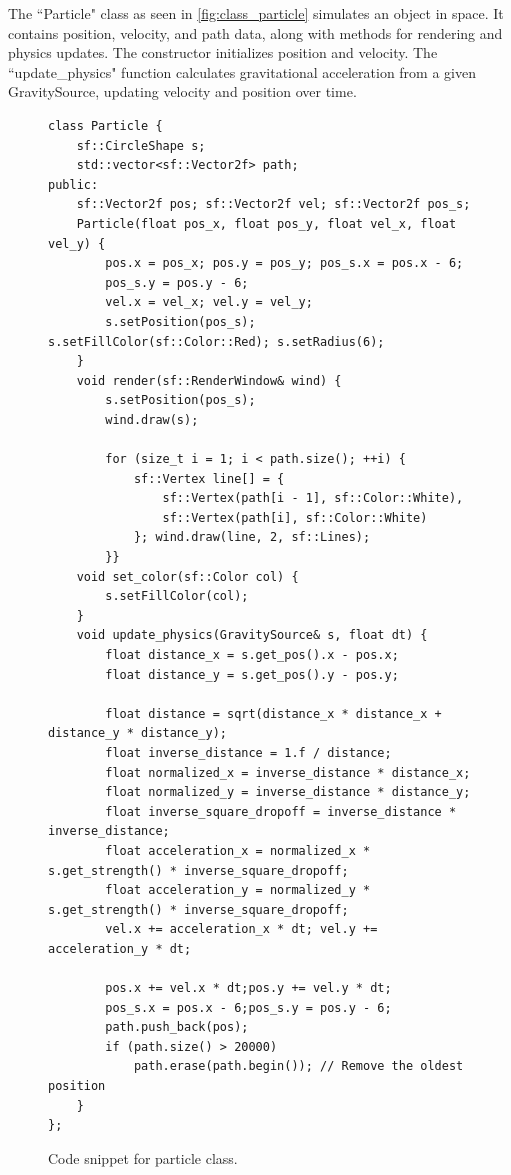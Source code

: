\documentclass[12pt, letter]{article}
\begin{document}
The ``Particle" class as seen in \autoref{fig:class_particle} simulates an object in space. It contains position, velocity, and path data, along with methods for rendering and physics updates. The constructor initializes position and velocity. The ``update\_physics" function calculates gravitational acceleration from a given GravitySource, updating velocity and position over time.

\begin{figure}[H]
    \begin{verbatim}
class Particle {
	sf::CircleShape s;
	std::vector<sf::Vector2f> path;
public:
	sf::Vector2f pos; sf::Vector2f vel; sf::Vector2f pos_s;
	Particle(float pos_x, float pos_y, float vel_x, float vel_y) {
		pos.x = pos_x; pos.y = pos_y; pos_s.x = pos.x - 6;
		pos_s.y = pos.y - 6;
		vel.x = vel_x; vel.y = vel_y;
		s.setPosition(pos_s); s.setFillColor(sf::Color::Red); s.setRadius(6);
	}
	void render(sf::RenderWindow& wind) {
		s.setPosition(pos_s);
		wind.draw(s);

		for (size_t i = 1; i < path.size(); ++i) {
			sf::Vertex line[] = {
				sf::Vertex(path[i - 1], sf::Color::White),
				sf::Vertex(path[i], sf::Color::White)
			}; wind.draw(line, 2, sf::Lines);
		}}
	void set_color(sf::Color col) {
		s.setFillColor(col);
	}
	void update_physics(GravitySource& s, float dt) {
		float distance_x = s.get_pos().x - pos.x;
		float distance_y = s.get_pos().y - pos.y;

		float distance = sqrt(distance_x * distance_x + distance_y * distance_y);
		float inverse_distance = 1.f / distance;
		float normalized_x = inverse_distance * distance_x;
		float normalized_y = inverse_distance * distance_y;
		float inverse_square_dropoff = inverse_distance * inverse_distance;
		float acceleration_x = normalized_x * s.get_strength() * inverse_square_dropoff;
		float acceleration_y = normalized_y * s.get_strength() * inverse_square_dropoff;
		vel.x += acceleration_x * dt; vel.y += acceleration_y * dt;

		pos.x += vel.x * dt;pos.y += vel.y * dt;
		pos_s.x = pos.x - 6;pos_s.y = pos.y - 6;
		path.push_back(pos);
		if (path.size() > 20000)
			path.erase(path.begin()); // Remove the oldest position
	}
};

    \end{verbatim}
    \caption{Code snippet for particle class.}
    \label{fig:class_particle}
\end{figure}
\end{document}
